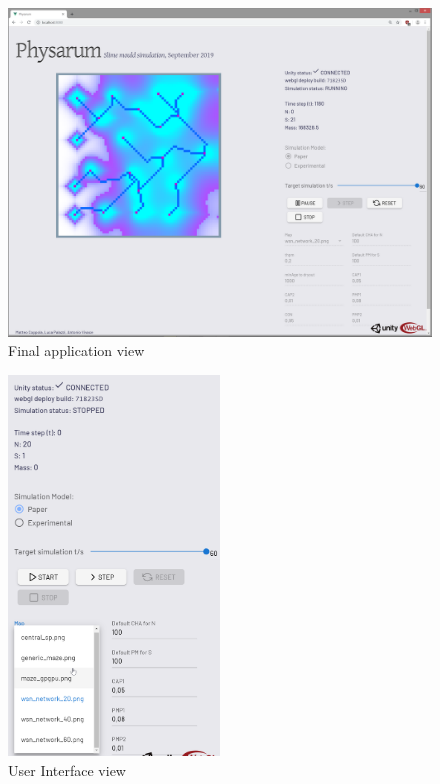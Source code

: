 \begin{figure}
  \centering
    \includegraphics[width=1\textwidth]{UI1}%
    
  \caption{Final application view}
  \label{fig:swstack1}
\end{figure}

\begin{figure}
  \centering
    \includegraphics[width=0.5\textwidth]{UI2}%
    
  \caption{User Interface view}
  \label{fig:swstack1}
\end{figure}


